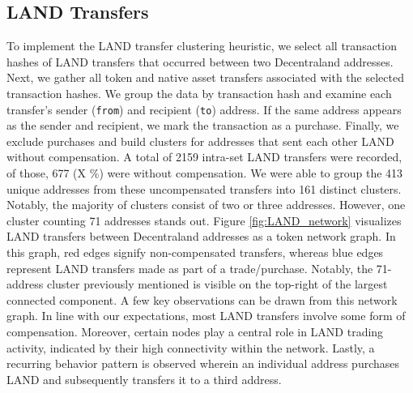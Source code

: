 \documentclass[12pt,a4paper,titlepage,oneside,english]{article}
\begin{document}
\subsection{LAND Transfers}
To implement the LAND transfer clustering heuristic, we select all transaction hashes of LAND transfers that occurred between two Decentraland addresses. Next, we gather all token and native asset transfers associated with the selected transaction hashes. We group the data by transaction hash and examine each transfer's sender (\texttt{from}) and recipient (\texttt{to}) address. If the same address appears as the sender and recipient, we mark the transaction as a purchase. Finally, we exclude purchases and build clusters for addresses that sent each other LAND without compensation. \newline
A total of 2159 intra-set LAND transfers were recorded, of those, 677 (X \%) were without compensation. We were able to group the 413 unique addresses from these uncompensated transfers into 161 distinct clusters. 
Notably, the majority of clusters consist of two or three addresses. However, one cluster counting 71 addresses stands out. \newline 
Figure \ref{fig:LAND_network} visualizes LAND transfers between Decentraland addresses as a token network graph. In this graph, red edges signify non-compensated transfers, whereas blue edges represent LAND transfers made as part of a trade/purchase. Notably, the 71-address cluster previously mentioned is visible on the top-right of the largest connected component. \newline
A few key observations can be drawn from this network graph. In line with our expectations, most LAND transfers involve some form of compensation. Moreover, certain nodes play a central role in LAND trading activity, indicated by their high connectivity within the network. Lastly, a recurring behavior pattern is observed wherein an individual address purchases LAND and subsequently transfers it to a third address.

\end{document}
